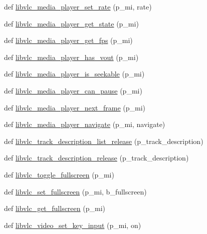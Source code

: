 \begin{DoxyCompactItemize}
def \hyperlink{namespacesrc_1_1lib_1_1vlc_ac2d2f9254dd743a62b6a0b00833f63c6}{libvlc\+\_\+media\+\_\+player\+\_\+set\+\_\+rate} (p\+\_\+mi, rate)
\item 
def \hyperlink{namespacesrc_1_1lib_1_1vlc_acb88d48e27691b72c223399db33e14e5}{libvlc\+\_\+media\+\_\+player\+\_\+get\+\_\+state} (p\+\_\+mi)
\item 
def \hyperlink{namespacesrc_1_1lib_1_1vlc_a84419a810605f3f165539c5714be5f05}{libvlc\+\_\+media\+\_\+player\+\_\+get\+\_\+fps} (p\+\_\+mi)
\item 
def \hyperlink{namespacesrc_1_1lib_1_1vlc_ac8cc11648520407e99992171f91ce40e}{libvlc\+\_\+media\+\_\+player\+\_\+has\+\_\+vout} (p\+\_\+mi)
\item 
def \hyperlink{namespacesrc_1_1lib_1_1vlc_a2907ea97c1646d7e917cc2b84ecef203}{libvlc\+\_\+media\+\_\+player\+\_\+is\+\_\+seekable} (p\+\_\+mi)
\item 
def \hyperlink{namespacesrc_1_1lib_1_1vlc_a8f84f1ce616325a4a8f032c1d91f2d1d}{libvlc\+\_\+media\+\_\+player\+\_\+can\+\_\+pause} (p\+\_\+mi)
\item 
def \hyperlink{namespacesrc_1_1lib_1_1vlc_a01983355ce05af4c7b009daf7144c931}{libvlc\+\_\+media\+\_\+player\+\_\+next\+\_\+frame} (p\+\_\+mi)
\item 
def \hyperlink{namespacesrc_1_1lib_1_1vlc_a9d8b7ccbb26a752aec9a1b333d843875}{libvlc\+\_\+media\+\_\+player\+\_\+navigate} (p\+\_\+mi, navigate)
\item 
def \hyperlink{namespacesrc_1_1lib_1_1vlc_a9f857a53703e87941a48ed667d6fa1e3}{libvlc\+\_\+track\+\_\+description\+\_\+list\+\_\+release} (p\+\_\+track\+\_\+description)
\item 
def \hyperlink{namespacesrc_1_1lib_1_1vlc_ac671dc5a339b4b92252eec10b1b8985c}{libvlc\+\_\+track\+\_\+description\+\_\+release} (p\+\_\+track\+\_\+description)
\item 
def \hyperlink{namespacesrc_1_1lib_1_1vlc_adfa1fca388e2136051a94a3b77a8d834}{libvlc\+\_\+toggle\+\_\+fullscreen} (p\+\_\+mi)
\item 
def \hyperlink{namespacesrc_1_1lib_1_1vlc_a5f9c0b30692b3145ca50814b6d0de5e0}{libvlc\+\_\+set\+\_\+fullscreen} (p\+\_\+mi, b\+\_\+fullscreen)
\item 
def \hyperlink{namespacesrc_1_1lib_1_1vlc_aa5333b9aca9801a5d8aa548c5cf3758a}{libvlc\+\_\+get\+\_\+fullscreen} (p\+\_\+mi)
\item 
def \hyperlink{namespacesrc_1_1lib_1_1vlc_ae4ea90f6324eb6d21d31c54208472448}{libvlc\+\_\+video\+\_\+set\+\_\+key\+\_\+input} (p\+\_\+mi, on)
\item 

\end{DoxyCompactItemize}
